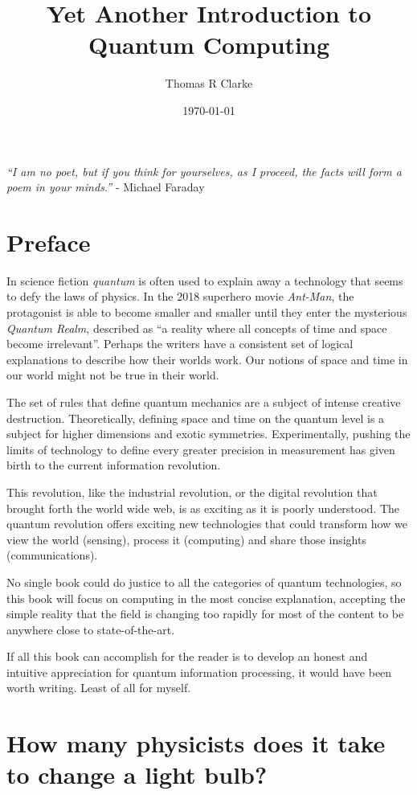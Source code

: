 \documentclass{book}
\title{Yet Another Introduction to Quantum Computing}
\author{Thomas R Clarke}
\date{\today}
\begin{document}
\maketitle
\tableofcontents

\textit{“I am no poet, but if you think for yourselves, as I proceed, the facts will form a poem in your minds.”} - Michael Faraday
\chapter{Preface}

In science fiction \textit{quantum} is often used to explain away a technology that seems to defy the laws of physics. In the 2018 superhero movie \textit{Ant-Man}, the protagonist is able to become smaller and smaller until they enter the mysterious \textit{Quantum Realm}, described as “a reality where all concepts of time and space become irrelevant”. Perhaps the writers have a consistent set of logical explanations to describe how their worlds work. Our notions of space and time in our world might not be true in their world. 

The set of rules that define quantum mechanics are a subject of intense creative destruction. Theoretically, defining space and time on the quantum level is a subject for higher dimensions and exotic symmetries. Experimentally, pushing the limits of technology to define every greater precision in measurement has given birth to the current information revolution. 

This revolution, like the industrial revolution, or the digital revolution that brought forth the world wide web, is as exciting as it is poorly understood. The quantum revolution offers exciting new technologies that could transform how we view the world (sensing), process it (computing) and share those insights (communications). 

No single book could do justice to all the categories of quantum technologies, so this book will focus on computing in the most concise explanation, accepting the simple reality that the field is changing too rapidly for most of the content to be anywhere close to state-of-the-art. 

If all this book can accomplish for the reader is to develop an honest and intuitive appreciation for quantum information processing, it would have been worth writing. Least of all for myself. 


\chapter{How many physicists does it take to change a light bulb?}
\end{document}
